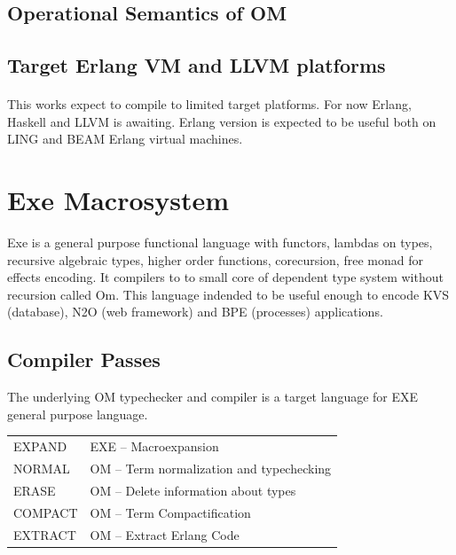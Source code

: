 \documentclass[11pt,oneside]{article}
\begin{document}
\subsection{Operational Semantics of OM}



\subsection{Target Erlang VM and LLVM platforms}

   \paragraph{}
   This works expect to compile to limited target platforms. For now Erlang, Haskell and LLVM is awaiting.
   Erlang version is expected to be useful both on LING and BEAM Erlang virtual machines.

\newpage
   \section{Exe Macrosystem}

   Exe is a general purpose functional language with functors, lambdas on types, recursive algebraic types,
   higher order functions, corecursion, free monad for effects encoding. It compilers to
   to small core of dependent type system without recursion called Om.
   This language indended to be useful enough to encode KVS (database), N2O (web framework) and
   BPE (processes) applications.

   \subsection{Compiler Passes}

   The underlying OM typechecker and compiler is a target language for EXE general purpose language.
   \begin{center}
   \begin{tabular}{ll}
   EXPAND  & EXE -- Macroexpansion\\
   NORMAL  & OM -- Term normalization and typechecking\\
   ERASE   & OM -- Delete information about types\\
   COMPACT & OM -- Term Compactification\\
   EXTRACT & OM -- Extract Erlang Code\\
   \end{tabular}
   \end{center}
\end{document}
